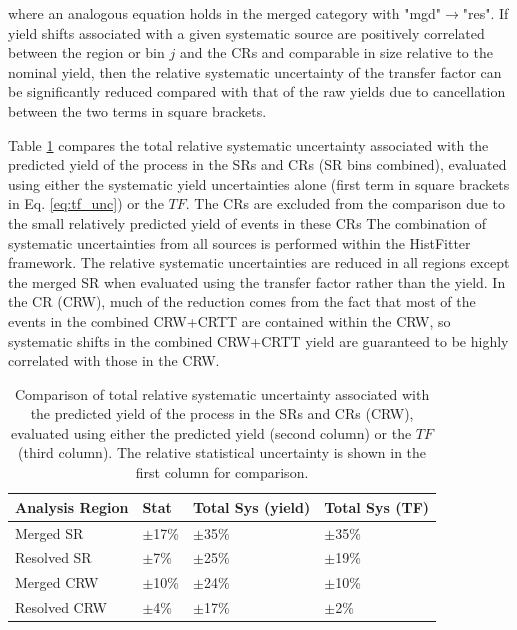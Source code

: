 \noindent where an analogous equation holds in the merged category with "mgd"\(\rightarrow\)"res". If yield shifts associated with a given systematic source are positively correlated between the region or bin \(j\) and the CRs and comparable in size relative to the nominal yield, then the relative systematic uncertainty of the transfer factor can be significantly reduced compared with that of the raw yields due to cancellation between the two terms in square brackets. 

Table \ref{tab:TF_sys_comp} compares the total relative systematic uncertainty associated with the predicted yield of the \wjets process in the SRs and \wjets CRs (SR bins combined), evaluated using either the systematic yield uncertainties alone (first term in square brackets in Eq. \ref{eq:tf_unc}) or the \(TF\). The \ttbar CRs are excluded from the comparison due to the small relatively predicted yield of \wjets events in these CRs The combination of systematic uncertainties from all sources is performed within the HistFitter framework. The relative systematic uncertainties are reduced in all regions except the merged SR when evaluated using the transfer factor rather than the yield. In the \wjets CR (CRW), much of the reduction comes from the fact that most of the \wjets events in the combined CRW+CRTT are contained within the CRW, so systematic shifts in the combined CRW+CRTT yield are guaranteed to be highly correlated with those in the CRW. 

\begin{table}[ht]
\begin{center}
\caption{\label{tab:TF_sys_comp} Comparison of total relative systematic uncertainty associated with the predicted yield of the \wjets process in the SRs and \wjets CRs (CRW), evaluated using either the predicted yield (second column) or the \(TF\) (third column). The relative statistical uncertainty is shown in the first column for comparison.}
\begin{tabular}{l l l l }
\toprule
\textbf{Analysis Region} &\textbf{Stat} &\textbf{Total Sys (yield)} & \textbf{Total Sys (TF)} \tabularnewline
\midrule
\midrule
Merged SR & \(\pm\)17\% & \(\pm\)35\% & \(\pm\)35\% \tabularnewline
\midrule
Resolved SR & \(\pm\)7\% & \(\pm\)25\% & \(\pm\)19\% \tabularnewline
\midrule
Merged CRW & \(\pm\)10\% & \(\pm\)24\% & \(\pm\)10\% \tabularnewline
\midrule
Resolved CRW & \(\pm\)4\% & \(\pm\)17\% & \(\pm\)2\% \tabularnewline
\bottomrule
\end{tabular}
\end{center}
\end{table}

